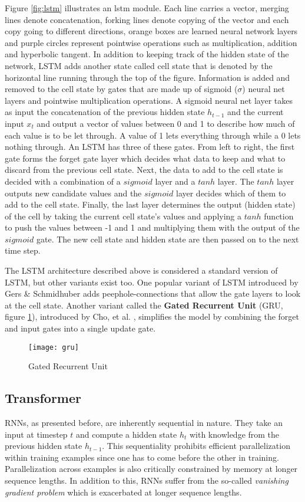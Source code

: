 Figure \ref{fig:lstm} illustrates an lstm module. Each line carries a vector, merging lines denote concatenation, forking lines denote copying of the vector and each copy going to different directions, orange boxes are learned neural network layers and purple circles represent pointwise operations such as multiplication, addition and hyperbolic tangent.
In addition to keeping track of the hidden state of the network, LSTM adds another state called cell state that is denoted by the horizontal line running through the top of the figure.
Information is added and removed to the cell state by gates that are made up of sigmoid ($\sigma$) neural net layers and pointwise multiplication operations.
A sigmoid neural net layer takes as input the concatenation of the previous hidden state $h_{t-1}$ and the current input $x_t$ and output a vector of values between 0 and 1 to describe how much of each value is to be let through.
A value of 1 lets everything through while a 0 lets nothing through.
An LSTM has three of these gates.
From left to right, the first gate forms the forget gate layer which decides what data to keep and what to discard from the previous cell state.
Next, the data to add to the cell state is decided with a combination of a $sigmoid$ layer and a $tanh$ layer. The $tanh$ layer outputs new candidate values and the $sigmoid$ layer decides which of them to add to the cell state.
Finally, the last layer determines the output (hidden state) of the cell by taking the current cell state's values and applying a $tanh$ function to push the values between -1 and 1 and multiplying them with the output of the $sigmoid$ gate.
The new cell state and hidden state are then passed on to the next time step.

The LSTM architecture described above is considered a standard version of LSTM, but other variants exist too.
One popular variant of LSTM introduced by Gers \& Schmidhuber \cite{gers2000a} adds peephole-connections that allow the gate layers to look at the cell state.
Another variant called the \textbf{Gated Recurrent Unit} (GRU, figure \ref{fig:gru}), introduced by Cho, et al. \cite{cho2014}, simplifies the model by combining the forget and input gates into a single update gate.

\begin{figure}[t]
\texttt{[image: gru]}
\centering
\caption{Gated Recurrent Unit}
\label{fig:gru}
\end{figure}

\subsection{Transformer} \label{Transformer}
RNNs, as presented before, are inherently sequential in nature.
They take an input at timestep $t$ and compute a hidden state $h_t$ with knowledge from the previous hidden state $h_{t-1}$.
This sequentiality prohibits efficient parallelization within training examples since one has to come before the other in training.
Parallelization across examples is also critically constrained by memory at longer sequence lengths.
In addition to this, RNNs suffer from the so-called \textit{vanishing gradient problem} which is exacerbated at longer sequence lengths.
\cite{vaswani2017}

